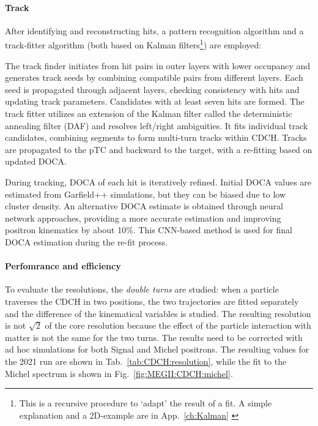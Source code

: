 \begin{refsection}
        \paragraph{Track} After identifying and reconstructing hits, a pattern recognition algorithm and a track-fitter algorithm (both based on Kalman filters\footnote{This is a recursive procedure to `adapt' the result of a fit. A simple explanation and a 2D-example are in App.~\ref{ch:Kalman} \cite{mythesis}}) are employed:

        \begin{outline}
            \1 The track finder initiates from hit pairs in outer layers with lower occupancy and generates track seeds by combining compatible pairs from different layers. 
            Each seed is propagated through adjacent layers, checking consistency with hits and updating track parameters. 
            Candidates with at least seven hits are formed.
            \1 The track fitter utilizes an extension of the Kalman filter called the deterministic annealing filter (DAF) \cite{Kalman:DAF} and resolves left/right ambiguities. 
            It fits individual track candidates, combining segments to form multi-turn tracks within CDCH. 
            Tracks are propagated to the pTC and backward to the target, with a re-fitting based on updated DOCA.
        \end{outline}

        \noindent
        During tracking, DOCA of each hit is iteratively refined. Initial DOCA values are estimated from Garfield++ simulations, but they can be biased due to low cluster density. 
        An alternative DOCA estimate is obtained through neural network approaches, providing a more accurate estimation and improving positron kinematics by about 10\%. 
        This CNN-based method is used for final DOCA estimation during the re-fit process.


        \paragraph{Perfomrance and efficiency}
        To evaluate the resolutions, the \textit{double turns} are studied: when a particle traverses the CDCH in two positions, the two trajectories are fitted separately and the difference of the kinematical variables is studied.
        The resulting resolution is not $\sqrt{2}$ of the core resolution because the effect of the particle interaction with matter is not the same for the two turns.
        The results need to be corrected with ad hoc simulations for both Signal and Michel positrons.
        The resulting values for the 2021 run are shown in Tab.~\ref{tab:CDCH:resolution}, while the fit to the Michel spectrum is shown in Fig.~\ref{fig:MEGII:CDCH:michel}.
        


\end{refsection}
